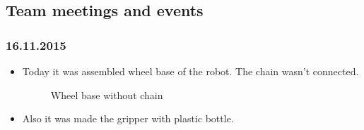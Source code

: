 \subsection{Team meetings and events}
\subsubsection{16.11.2015}
\begin{itemize}
\item Today it was assembled wheel base of the robot. The chain wasn't connected.
\begin{figure}[H]
	\begin{minipage}[h]{1\linewidth}
		\caption{Wheel base without chain}
	\end{minipage}
\end{figure} 
\item Also it was made the gripper with plastic bottle.
\begin{figure}[H]
	\begin{minipage}[h]{1\linewidth}

\end{minipage}
\end{figure}
\end{itemize}

